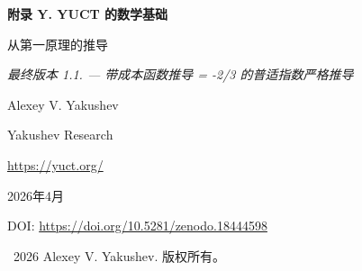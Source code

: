 \documentclass[11pt,a4paper]{article}
\begin{document}
	
	\begin{titlepage}
		\centering
		\vspace*{0cm}
		
		{\Huge\bfseries 附录 Y. YUCT 的数学基础\par}
		\vspace{0.3cm}
		{\Large 从第一原理的推导\par}
		\vspace{0.3cm}
		{\large \textit{最终版本 1.1. — 带成本函数推导 \mu = -2/3 的普适指数严格推导}\par}
		\vspace{1.5cm}
		
		{\large Alexey V. Yakushev\par}
		\vspace{0.3cm}
		{\normalsize Yakushev Research\par}
		{\normalsize \url{https://yuct.org/}\par}
		
		\vspace{0.5cm}
		{\normalsize 2026年4月\par}
		\vspace{0.3cm}
		{\normalsize DOI: \url{https://doi.org/10.5281/zenodo.18444598}\par}
		
		\vfill
		
		\begin{abstract}
			\noindent
			本文以严格且自洽的形式呈现了 Yakushev 统一协调理论 (YUCT) 的数学基础。从协调簇和效率参数 \(K_{\mathrm{eff}}\) 的定义出发，我们构建了协调网络的微观模型。从三个基本公理——层次标度不变性、词典的二元完备性和三维嵌入——我们确定了熵在层级间的分布。加入第四个宏观标度不变性公理和一个显式的索引传递成本函数，我们推导出普适误差律 \(\varepsilon \propto K_{\mathrm{eff}}^{-\beta}\)，其中 \(\beta = 2/3\)，作为定理。协调场的有效标量-张量作用量、修正爱因斯坦方程、宇宙学常数的拓扑起源以及费米子质量等级随后被引入为基于核心定理的推论或猜想。所有陈述均明确标记为公理、定理、猜想、假设或现象学定律。该理论做出了具体的、可证伪的预测，包括温度依赖的引力常数。一个新章节将普适误差律与素数的渐近分布联系起来（正文定理~4），表明相同的指数 \(\beta = 2/3\) 支配着素数涨落。
		\end{abstract}
		
		\vspace{0.5cm}
		\textcopyright\ 2026 Alexey V. Yakushev. 版权所有。
	\end{titlepage}
	
	\tableofcontents
	\newpage
	
\end{document}
